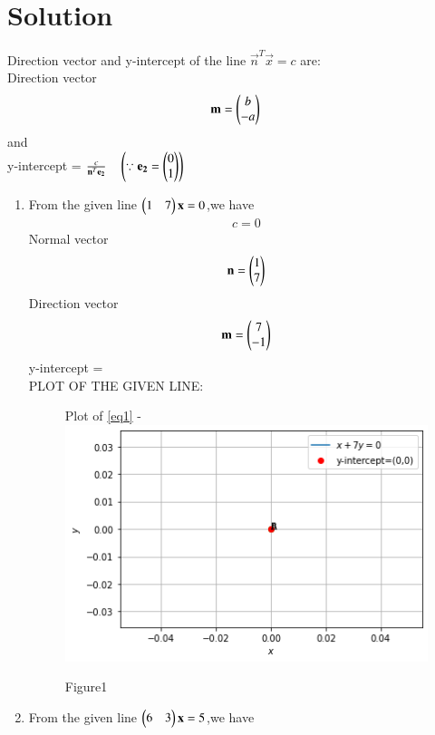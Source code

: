 \documentclass[journal,12pt,twocolumn]{IEEEtran}
\begin{document}
\section{Solution}
\begin{lemma}
\label{lemma}
Direction vector and y-intercept of the line $\vec{n}^T\vec{x}=c$ are:
\\
Direction vector
\begin{align}
\mathbf{m}= \begin{pmatrix}b \\ -a\end{pmatrix}
\end{align}
and
\\
y-intercept = $\frac{c}{\mathbf{n}^T\mathbf{e_2}} \quad\left(\because \mathbf{e_2}=\begin{pmatrix}0\\1\end{pmatrix}\right)$
\end{lemma}
\begin{enumerate}
\item From the given line $\begin{pmatrix}1 & 7\end{pmatrix}\mathbf{x}=0$,we have
\begin{align}
c=0
\end{align}
Normal vector
\begin{align}
\begin{split}
\mathbf{n} = \begin{pmatrix}1 \\ 7\end{pmatrix}
\end{split}
\end{align}
Direction vector
\begin{align}
\mathbf{m} = \begin{pmatrix}7 \\ -1\end{pmatrix}
\end{align}
y-intercept = 
\\
PLOT OF THE GIVEN LINE:
\begin{figure}[ht!]
Plot of \eqref{eq1} -
\centering
\includegraphics[width=\columnwidth,height=5 cm]{Fig1.png}
\caption{Figure1}
\end{figure}
\item From the given line $\begin{pmatrix}6 & 3\end{pmatrix}\mathbf{x}=5$,we have
\begin{align}

\end{align}
\end{enumerate}
\end{document}
